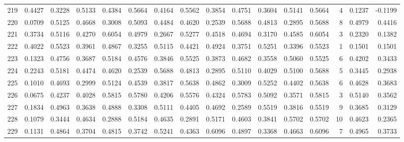 \begin{tabular}{lrrrrrrrrrrrrrrr}
219 &      0.4427 &  0.3228 &  0.5133 &  0.4384 &  0.5664 &  0.4164 &  0.5562 &  0.3854 &  0.4751 &  0.3604 &   0.5141 &     0.5664 &      4 &                    0.1237 &                    -0.1199 \\
220 &      0.0709 &  0.5125 &  0.4668 &  0.3008 &  0.5093 &  0.4484 &  0.4620 &  0.2539 &  0.5688 &  0.4813 &   0.2895 &     0.5688 &      8 &                    0.4979 &                     0.4416 \\
221 &      0.3734 &  0.5116 &  0.4270 &  0.6054 &  0.4979 &  0.2667 &  0.5277 &  0.4518 &  0.4694 &  0.3170 &   0.4585 &     0.6054 &      3 &                    0.2320 &                     0.1382 \\
222 &      0.4022 &  0.5523 &  0.3961 &  0.4867 &  0.3255 &  0.5115 &  0.4421 &  0.4924 &  0.3751 &  0.5251 &   0.3396 &     0.5523 &      1 &                    0.1501 &                     0.1501 \\
223 &      0.1323 &  0.4756 &  0.3687 &  0.5184 &  0.4576 &  0.3846 &  0.5525 &  0.3873 &  0.4682 &  0.3558 &   0.5060 &     0.5525 &      6 &                    0.4202 &                     0.3433 \\
224 &      0.2243 &  0.5181 &  0.4474 &  0.4620 &  0.2539 &  0.5688 &  0.4813 &  0.2895 &  0.5110 &  0.4029 &   0.5100 &     0.5688 &      5 &                    0.3445 &                     0.2938 \\
225 &      0.1010 &  0.4693 &  0.2999 &  0.5124 &  0.4539 &  0.3817 &  0.5638 &  0.4862 &  0.3009 &  0.5252 &   0.4402 &     0.5638 &      6 &                    0.4628 &                     0.3683 \\
226 &      0.0675 &  0.4237 &  0.4028 &  0.5815 &  0.5780 &  0.4206 &  0.5576 &  0.4324 &  0.5783 &  0.5092 &   0.3571 &     0.5815 &      3 &                    0.5140 &                     0.3562 \\
227 &      0.1834 &  0.4963 &  0.3638 &  0.4888 &  0.3308 &  0.5111 &  0.4405 &  0.4692 &  0.2589 &  0.5519 &   0.3816 &     0.5519 &      9 &                    0.3685 &                     0.3129 \\
228 &      0.1079 &  0.3444 &  0.4634 &  0.2888 &  0.5184 &  0.4635 &  0.2891 &  0.5171 &  0.4603 &  0.3841 &   0.5702 &     0.5702 &     10 &                    0.4623 &                     0.2365 \\
229 &      0.1131 &  0.4864 &  0.3704 &  0.4815 &  0.3742 &  0.5241 &  0.4363 &  0.6096 &  0.4897 &  0.3368 &   0.4663 &     0.6096 &      7 &                    0.4965 &                     0.3733 \\

\end{tabular}
